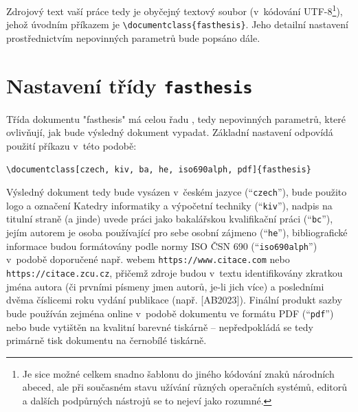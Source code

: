 \documentclass[czech, ma, kiv, he, iso690alph, pdf, viewonly]{fasthesis}
\begin{document}
Zdrojový text vaší práce tedy je obyčejný textový soubor (v~kódování UTF-8\footnote{Je sice možné celkem snadno šablonu  do jiného kódování znaků národních abeced, ale při současném stavu užívání různých operačních systémů, editorů a dalších podpůrných nástrojů se to nejeví jako rozumné.}), jehož úvodním příkazem je \verb"\documentclass{fasthesis}". Jeho detailní nastavení prostřednictvím nepovinných parametrů bude popsáno dále.
%
%
%
\section{Nastavení třídy \texttt{fasthesis}}
Třída dokumentu \filename"fasthesis" má celou řadu , tedy nepovinných parametrů, které ovlivňují, jak bude výsledný dokument vypadat. Základní nastavení odpovídá použití příkazu v~této podobě:
\lstset{style=plainsrc, numbers=none}
\begin{lstlisting}
\documentclass[czech, kiv, ba, he, iso690alph, pdf]{fasthesis}
\end{lstlisting}
Výsledný dokument tedy bude vysázen v~českém jazyce (``\verb"czech"''), bude použito logo a označení Katedry informatiky a výpočetní techniky (``\verb"kiv"''), nadpis na titulní straně (a jinde) uvede práci jako bakalářskou kvalifikační práci (``\verb"bc"''), jejím autorem je osoba používající pro sebe osobní zájmeno  (``\verb"he"''), bibliografické informace budou formátovány podle
normy ISO ČSN 690 (``\verb"iso690alph"'') v~podobě doporučené např. webem \texttt{https://www.citace.com} nebo \texttt{https://citace.zcu.cz}, přičemž zdroje budou v~textu identifikovány zkratkou jména autora (či prvními písmeny jmen autorů, je-li jich více) a posledními dvěma číslicemi roku vydání publikace (např. [AB2023]).
Finální produkt sazby bude používán zejména online v~podobě dokumentu ve formátu PDF (``\verb"pdf"'') nebo bude vytištěn na kvalitní barevné tiskárně -- nepředpokládá se tedy primárně tisk dokumentu na černobílé tiskárně.
%
%
%
\end{document}
